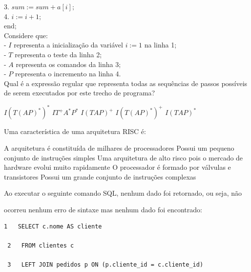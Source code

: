 \documentclass[12pt, addpoints]{exam}
\begin{document}
\begin{questions}
3. \( sum := sum + a[i]; \)\\

4. \( i := i + 1; \)\\

   end;\\



Considere que:\\

- \( I \) representa a inicialização da variável \( i := 1 \) na linha 1;\\

- \( T \) representa o teste da linha 2;\\

- \( A \) representa os comandos da linha 3;\\

- \( P \) representa o incremento na linha 4.\\



Qual é a expressão regular que representa todas as sequências de passos possíveis de serem executados por este trecho de programa?
\begin{choices}
\choice \( I(T(AP)^*)^* \)
\choice \( IT^+A^*P^* \)
\choice \( I(TAP)^+ \)
\choice \( I(T(AP)^*)^+ \)
\choice \( I(TAP)^* \)
\end{choices}

\question

Uma característica de uma arquitetura RISC é:
\begin{choices}
\choice A arquitetura é constituída de milhares de processadores
\choice Possui um pequeno conjunto de instruções simples
\choice Uma arquitetura de alto risco pois o mercado de hardware evolui muito rapidamente
\choice O processador é formado por válvulas e transistores
\choice Possui um grande conjunto de instruções complexas
\end{choices}

\question

Ao executar o seguinte comando SQL, nenhum dado foi retornado, ou seja, não

ocorreu nenhum erro de sintaxe mas nenhum dado foi encontrado:

\begin{tcolorbox}

 \begin{verbatim}1   SELECT c.nome AS cliente

 2   FROM clientes c

 3   LEFT JOIN pedidos p ON (p.cliente_id = c.cliente_id)


\end{verbatim}
\end{tcolorbox}
\end{questions}
\end{document}

